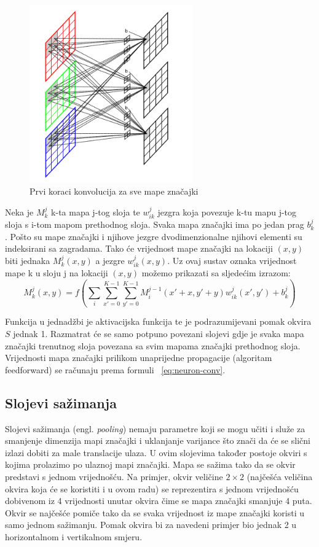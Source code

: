 \documentclass[times, utf8, zavrsni, numeric]{fer}
\begin{document}
\begin{figure}
    \centering
    \includegraphics[width=7cm]{img/konvolucija.png}
    \caption{Prvi koraci konvolucija za sve mape značajki}
    \label{fig:konvolucija}
\end{figure}

Neka je $M^j_k$ k-ta mapa j-tog sloja te $w^j_{ik}$ jezgra koja povezuje k-tu mapu j-tog sloja s i-tom mapom prethodnog sloja. Svaka mapa značajki ima po jedan prag $b^j_k$. Pošto su mape značajki i njihove jezgre dvodimenzionalne njihovi elementi su indeksirani sa zagradama. Tako će vrijednost mape značajki na lokaciji $(x, y)$ biti jednaka $M^j_k (x, y)$ a jezgre $w^j_{ik} (x, y)$. Uz ovaj sustav oznaka vrijednost mape k u sloju j na lokaciji $(x, y)$ možemo prikazati sa sljedećim izrazom:
\begin{equation}\label{eq:neuron-conv}
M^j_k (x, y) = f(\sum_i \sum_{x'=0}^{K-1} \sum_{y'=0}^{K-1} M^{j-1}_i (x' + x, y' + y) w^j_{ik} (x', y') + b^j_k )
\end{equation}

Funkcija u jednadžbi je aktivacijska funkcija te je podrazumijevani pomak okvira $S$ jednak 1. Razmatrat će se samo potpuno povezani slojevi gdje je svaka mapa značajki trenutnog sloja povezana sa svim mapama značajki prethodnog sloja. Vrijednosti mapa značajki prilikom unaprijedne propagacije (algoritam feedforward) se računaju prema formuli ~\ref{eq:neuron-conv}.

\subsection{Slojevi sažimanja}\label{Slojevi sažimanja}
Slojevi sažimanja (engl. \textit{pooling}) nemaju parametre koji se mogu učiti i služe za smanjenje dimenzija mapi značajki i uklanjanje varijance što znači da će se slični izlazi dobiti za male translacije ulaza. U ovim slojevima također postoje okviri s kojima prolazimo po ulaznoj mapi značajki. Mapa se sažima tako da se okvir predstavi s jednom vrijednošću. Na primjer, okvir veličine $2 \times 2$ (najčešća veličina okvira koja će se koristiti i u ovom radu) se reprezentira s jednom vrijednošću dobivenom iz 4 vrijednosti unutar okvira čime se mapa značajki smanjuje 4 puta. Okvir se najčešće pomiče tako da se svaka vrijednost iz mape značajki koristi u samo jednom sažimanju. Pomak okvira bi za navedeni primjer bio jednak 2 u horizontalnom i vertikalnom smjeru.
\end{document}
